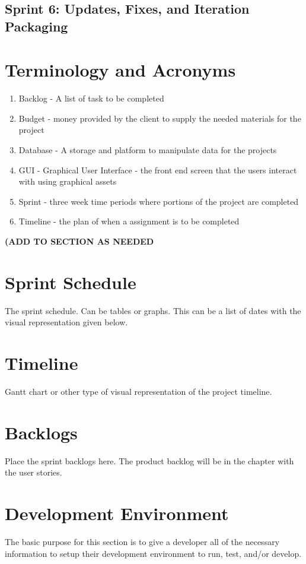 \subsection{Sprint 6: Updates, Fixes, and Iteration Packaging}


\section{Terminology and Acronyms}
\begin{enumerate}
\item Backlog - A list of task to be completed
\item Budget - money provided by the client to supply the needed materials for the project
\item Database - A storage and platform to manipulate data for the projects 
\item GUI - Graphical User Interface - the front end screen that the users interact with using graphical assets
\item Sprint - three week time periods where portions of the project are completed
\item Timeline - the plan of when a assignment is to be completed
\end{enumerate}
\bf(ADD TO SECTION AS NEEDED 

\section{Sprint Schedule}
The sprint schedule.  Can be tables or graphs.   This can be a list of dates with the visual 
representation given below.

\section{Timeline}
Gantt chart or other type of visual representation of the project timeline.

\section{Backlogs}
Place the sprint backlogs here.    The product backlog will be in the chapter with the user 
stories.   


\section{Development Environment}
The basic purpose for this section is to give a developer all of the necessary 
information to setup their development environment to run, test, and/or develop. 


